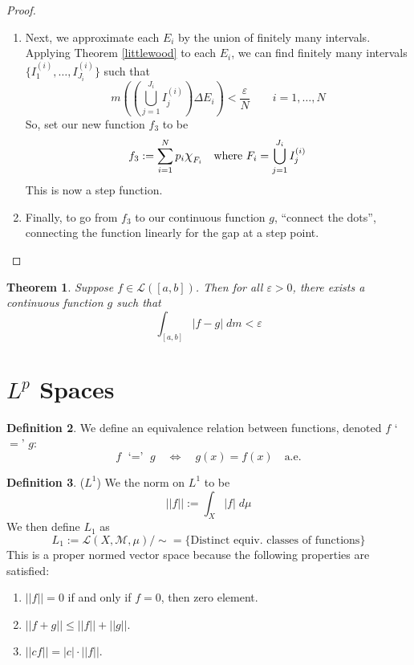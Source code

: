 \documentclass[12pt]{article}
\theoremstyle{plain}
\newtheorem{thm}{Theorem}[subsection]
\theoremstyle{definition}
\newtheorem{defn}[thm]{Definition}
\theoremstyle{remark}
\newcommand*{\Chi}{\mbox{\large$\chi$}} %
\begin{document}
\begin{proof}
\begin{enumerate}
\item Next, we approximate each $E_i$ by the union of finitely many intervals. Applying Theorem \ref{littlewood} to each $E_i$, we can find finitely many intervals $\{I^{(i)}_1,\ldots,I^{(i)}_{J_i}\}$ such that  
\[
    m\left(\left(\bigcup^{J_i}_{j=1} I^{(i)}_j \right)
    \Delta E_i\right) < \frac{\varepsilon}{N}
    \qquad i = 1, \ldots,N
\]
So, set our new function $f_3$ to be 
\[
    f_3 := \sum^N_{i=1} p_i 
    \Chi_{F_i}
    \quad \text{where }
    F_i = \bigcup^{J_i}_{j=1} I_j^{(i)}
\]
This is now a step function. 

\item Finally, to go from $f_3$ to our continuous function $g$, ``connect the dots'', connecting the function linearly for the gap at a step point.

\end{enumerate}

\end{proof}

\begin{thm}
Suppose $f\in\mathscr{L}([a,b])$. Then for all $\varepsilon>0$, there exists a continuous function $g$ such that 
\[
    \int_{[a,b]} |f-g| \; dm < \varepsilon
\]
\end{thm}



\newpage
\section{$L^p$ Spaces}

\begin{defn}
We define an equivalence relation between functions, denoted $f$ `$=$' $g$:
\[
    f \text{ `$=$' } g
    \quad \Leftrightarrow\quad 
    g(x) = f(x) \quad \text{a.e.}
\]
\end{defn}

\begin{defn} ($L^1$) We the norm on $L^1$ to be
\[
    ||f||:= \int_X |f| \; d\mu
\]
We then define $L_1$ as
\[
    L_1 := \mathscr{L}(X,\mathscr{M},\mu) / \sim
    = \{\text{Distinct equiv. classes of functions}\}
\]
This is a proper normed vector space because the following properties are satisfied:
\begin{enumerate}
    \item $||f|| = 0$ if and only if $f=0$, then zero element.
    \item $||f+g||\leq ||f|| + ||g||$.
    \item $||c f|| = |c| \cdot ||f||$.
\end{enumerate}
\end{defn}
\end{document}
